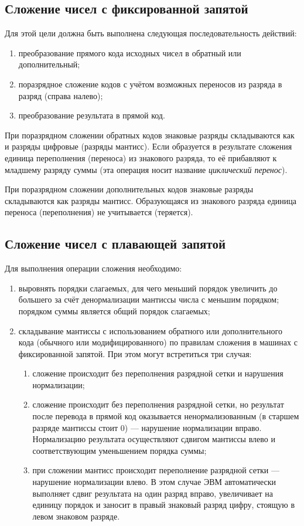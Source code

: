 \documentclass[10pt,a4paper,titlepage]{article}
\begin{document}
\subsection{Сложение чисел с фиксированной запятой}

Для этой цели должна быть выполнена следующая последовательность действий:

\begin{enumerate}
\item преобразование прямого кода исходных чисел в обратный или дополнительный;
\item поразрядное сложение кодов с учётом возможных переносов из разряда в разряд (справа налево);
\item преобразование результата в прямой код.
\end{enumerate}

При поразрядном сложении обратных кодов знаковые разряды складываются как и разряды цифровые (разряды мантисс).
Если образуется в результате сложения единица переполнения (переноса) из знакового разряда, то её прибавляют к младшему разряду суммы (эта операция носит название \textit{циклический перенос}).

При поразрядном сложении дополнительных кодов знаковые разряды складываются как разряды мантисс.
Образующаяся из знакового разряда единица переноса (переполнения) не учитывается (теряется).

\subsection{Сложение чисел с плавающей запятой}

Для выполнения операции сложения необходимо:

\begin{enumerate}
\item выровнять порядки слагаемых, для чего меньший порядок увеличить до большего за счёт денормализации мантиссы числа с меньшим порядком; порядком суммы является общий порядок слагаемых;
\item складывание мантиссы с использованием обратного или дополнительного кода (обычного или модифицированного) по правилам сложения в машинах с фиксированной запятой.
При этом могут встретиться три случая:
\begin{enumerate}
\item сложение происходит без переполнения разрядной сетки и нарушения нормализации;
\item сложение происходит без переполнения разрядной сетки, но результат после перевода в прямой код оказывается ненормализованным (в старшем разряде мантиссы стоит 0) --- нарушение нормализации вправо.
Нормализацию результата осуществляют сдвигом мантиссы влево и соответствующим уменьшением порядка суммы;
\item при сложении мантисс происходит переполнение разрядной сетки --- нарушение нормализации влево.
В этом случае ЭВМ автоматически выполняет сдвиг результата на один разряд вправо, увеличивает на единицу порядок и заносит в правый знаковый разряд цифру, стоящую в левом знаковом разряде.
\end{enumerate}
\end{enumerate}
\end{document}
